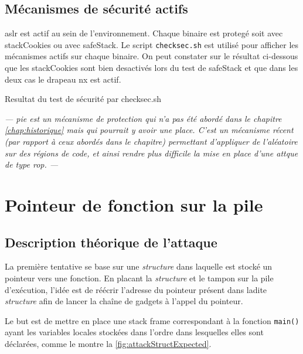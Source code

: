 \subsection{Mécanismes de sécurité actifs}

\gls{aslr} est actif au sein de l'environnement. Chaque binaire est protegé soit avec \gls{stackCookies} ou avec \gls{safeStack}. Le script \texttt{checksec.sh} \cite{CheckSec} est utilisé pour afficher les mécanismes actifs sur chaque binaire. On peut constater sur le résultat ci-dessous que les \gls{stackCookies} sont bien desactivés lors du test de \gls{safeStack} et que dans les deux cas le drapeau \gls{nx} est actif.

\begin{listing}
	\caption{Resultat du test de sécurité par checksec.sh}
	\label{lst:checksecRes}
\end{listing}

\textit{--- \gls{pie} est un mécanisme de protection qui n'a pas été abordé dans le chapitre \ref{chap:historique} mais qui pourrait y avoir une place. C'est un mécanisme récent (par rapport à ceux abordés dans le chapitre) permettant d'appliquer de l'aléatoire sur des régions de code, et ainsi rendre plus difficile la mise en place d'une attque de type \gls{rop}. ---}


\section{Pointeur de fonction sur la pile}

\subsection{Description théorique de l'attaque}

La première tentative se base sur une \textit{structure} dans laquelle est stocké un pointeur vers une fonction. En placant la \textit{structure} et le tampon sur la pile d'exécution, l'idée est de réécrir l'adresse du pointeur présent dans ladite \textit{structure} afin de lancer la chaîne de gadgets à l'appel du pointeur.

Le but est de mettre en place une \og stack frame \fg correspondant à la fonction \texttt{main()} ayant les variables locales stockées dans l'ordre dans lesquelles elles sont déclarées, comme le montre la \autoref{fig:attackStructExpected}.

